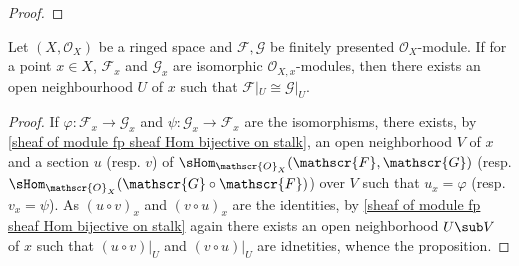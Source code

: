 \begin{proof}

\end{proof}
\begin{proposition}\label{sheaf of module fp isomorphic on stalk}
Let $(X,\mathscr{O}_X)$ be a ringed space and $\mathscr{F},\mathscr{G}$ be finitely presented $\mathscr{O}_X$-module. If for a point $x\in X$, $\mathscr{F}_x$ and $\mathscr{G}_x$ are isomorphic $\mathscr{O}_{X,x}$-modules, then there exists an open neighbourhood $U$ of $x$ such that $\mathscr{F}|_U\cong\mathscr{G}|_U$.
\end{proposition}
\begin{proof}
If $\varphi:\mathscr{F}_x\to\mathscr{G}_x$ and $\psi:\mathscr{G}_x\to\mathscr{F}_x$ are the isomorphisms, there exists, by \cref{sheaf of module fp sheaf Hom bijective on stalk}, an open neighborhood $V$ of $x$ and a section $u$ (resp. $v$) of $\sHom_{\mathscr{O}_X}(\mathscr{F},\mathscr{G})$ (resp. $\sHom_{\mathscr{O}_X}(\mathscr{G}\circ\mathscr{F})$) over $V$ such that $u_x=\varphi$ (resp. $v_x=\psi$). As $(u\circ v)_x$ and $(v\circ u)_x$ are the identities, by \cref{sheaf of module fp sheaf Hom bijective on stalk} again there exists an open neighborhood $U\sub V$ of $x$ such that $(u\circ v)|_U$ and $(v\circ u)|_U$ are idnetities, whence the proposition.
\end{proof}
